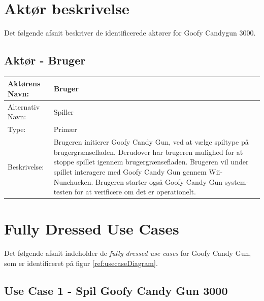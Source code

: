 \section{Aktør beskrivelse}
Det følgende afsnit beskriver de identificerede aktører for Goofy Candygun 3000.

\subsection{Aktør - Bruger}

\begin{tabularx}{\textwidth}{| p{2cm} | p{9.1cm} |}
	\hline
	Aktørens Navn: & Bruger \\ 
	\hline
	Alternativ Navn: & Spiller \\
	\hline
	Type: & Primær \\
	\hline
	Beskrivelse: & Brugeren initierer Goofy Candy Gun, ved at vælge spiltype på brugergrænsefladen. Derudover har brugeren mulighed for at stoppe spillet igennem brugergrænsefladen. Brugeren vil under spillet interagere med Goofy Candy Gun gennem Wii-Nunchucken. \newline
	Brugeren starter også Goofy Candy Gun system-testen for at verificere om det er operationelt. \\
	\hline
\end{tabularx}

\section{Fully Dressed Use Cases}

Det følgende afsnit indeholder de \textit{fully dressed use cases} for Goofy Candy Gun, som er identificeret på figur \ref{ref:usecaseDiagram}.
\subsection{Use Case 1 - Spil Goofy Candy Gun 3000}

